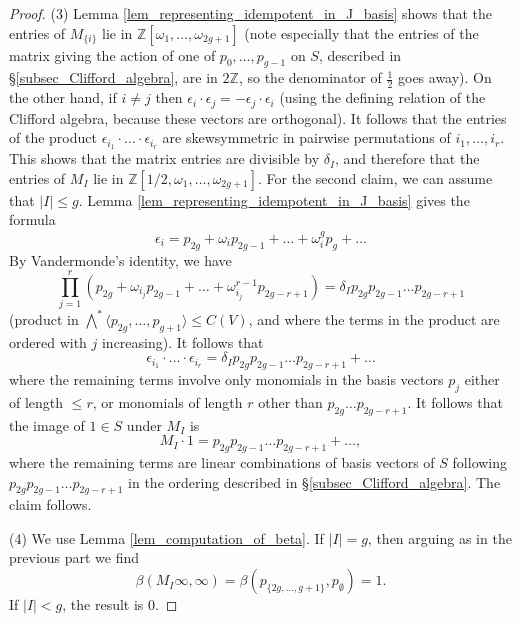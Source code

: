 \documentclass{article} %
\numberwithin{equation}{section}
\newcommand{\Z}{\mathbb{Z}}
\begin{document}
\begin{proof}
    (3)  Lemma \ref{lem_representing_idempotent_in_J_basis} shows that the entries of $M_{ \{ i \} }$ lie in $\Z[\omega_1, \dots, \omega_{2g+1}]$ (note especially that the entries of the matrix giving the action of one of $p_0, \dots, p_{g-1}$ on $S$, described in \S \ref{subsec_Clifford_algebra}, are in $2 \Z$, so the denominator of $\frac{1}{2}$ goes away).  On the other hand, if $i \neq j$ then $\epsilon_i \cdot \epsilon_j = - \epsilon_j \cdot \epsilon_i$ (using the defining relation of the Clifford algebra, because these vectors are orthogonal). It follows that the entries of the product $\epsilon_{i_1} \cdot \dots \cdot \epsilon_{i_r}$ are skewsymmetric in pairwise permutations of $i_1, \dots, i_r$. This shows that the matrix entries are divisible by $\delta_I$, and therefore that the entries of $M_I$ lie in $\Z[1/2, \omega_1, \dots, \omega_{2g+1}]$. For the second claim, we can assume that $|I| \leq g$. Lemma \ref{lem_representing_idempotent_in_J_basis} gives the formula
    \begin{equation}\label{eqn_image_of_D_i} \epsilon_i = p_{2g} + \omega_i p_{2g-1} + \dots + \omega_i^g p_g + \dots 
    \end{equation}
    By Vandermonde's identity, we have
    \[ \prod_{j=1}^r (p_{2g} + \omega_{i_j} p_{2g-1} + \dots + \omega_{i_j}^{r-1} p_{2g-r+1}) = \delta_I p_{2g} p_{2g-1} \dots p_{2g-r+1}  \]
    (product in $\bigwedge^\ast \langle p_{2g}, \dots, p_{g+1} \rangle \leq C(V)$, and where the terms in the product are ordered with $j$ increasing).  It follows that
    \[ \epsilon_{i_1} \cdot \dots \cdot \epsilon_{i_r} = \delta_I p_{2g} p_{2g-1} \dots p_{2g-r+1} + \dots \]
    where the remaining terms involve only monomials in the basis vectors $p_j$ either of length $\leq r$, or monomials of length $r$ other than $p_{2g} \dots p_{2g-r+1}$. It follows that the image of $1 \in S$ under $M_I$ is
    \begin{equation}\label{eqn_image_of_D_I} M_I \cdot 1 = p_{2g} p_{2g-1} \dots p_{2g-r+1} + \dots, 
    \end{equation}
    where the remaining terms are linear combinations of basis vectors of $S$ following $p_{2g} p_{2g-1} \dots p_{2g-{r+1}}$ in the ordering described in \S \ref{subsec_Clifford_algebra}. The claim follows. 

    (4) We use Lemma \ref{lem_computation_of_beta}. If $|I| = g$, then arguing as in the previous part we find
    \[ \beta(M_I \infty, \infty) = \beta(p_{\{ 2g, \dots, g+1 \}},p_{\emptyset}) =  1. \]
    If $|I| < g$, the result is 0. 
\end{proof}
\end{document}
